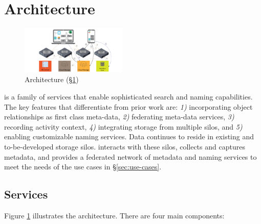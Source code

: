 \section{Architecture}
\label{sec:arch}

\begin{figure}
    \centering
    \includegraphics[width=0.45\textwidth]{figures/naming3.png}
    \caption{\system Architecture (\S \ref{sec:arch})}
    \label{fig:arch}
\end{figure}



\system is a family of services that enable sophisticated search and naming capabilities.
The key features that differentiate \system from prior work are: 
\textit{1)} incorporating object relationships as first class meta-data,
\textit{2)} federating meta-data services,
\textit{3)} recording activity context,
\textit{4)} integrating storage from multiple silos, and
\textit{5)} enabling customizable naming services.
Data continues to reside in existing and to-be-developed storage silos.
\system interacts with these silos, collects and captures metadata, and 
provides a federated network of metadata and naming services to
meet the needs of the use cases in \S \ref{sec:use-cases}.


\subsection{\system Services}

Figure \ref{fig:arch} illustrates the \system architecture. There are four main components:

